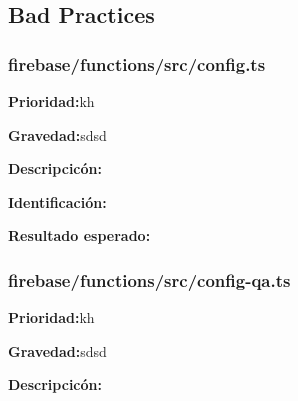 \documentclass{article}
\begin{document}
    \subsection{Bad Practices}
        \subsubsection{firebase/functions/src/config.ts}
        \begingroup
        \noindent
        \leftskip 35pt 
        \rightskip 0pt 
        \vspace{10pt}
        \textbf{Prioridad:}kh

        \endgroup

        \begingroup
        \noindent
        \leftskip 35pt 
        \rightskip 0pt 
        \vspace{10pt}
        \textbf{Gravedad:}sdsd

        \endgroup
            
        \begingroup
        \noindent
        \leftskip 35pt 
        \rightskip 0pt 
        \vspace{10pt}
        \textbf{Descripcicón:}
    
        \endgroup

        \begingroup
        \noindent
        \leftskip 35pt 
        \rightskip 0pt 
        \vspace{10pt}
        \textbf{Identificación:}
        
        \endgroup

        \begingroup
        \noindent
        \leftskip 35pt 
        \rightskip 0pt 
        \vspace{10pt}
        \textbf{Resultado esperado:}
    
        \endgroup
        \subsubsection{firebase/functions/src/config-qa.ts}
        \begingroup
        \noindent
        \leftskip 35pt 
        \rightskip 0pt 
        \vspace{10pt}
        \textbf{Prioridad:}kh

        \endgroup

        \begingroup
        \noindent
        \leftskip 35pt 
        \rightskip 0pt 
        \vspace{10pt}
        \textbf{Gravedad:}sdsd

        \endgroup
            
        \begingroup
        \noindent
        \leftskip 35pt 
        \rightskip 0pt 
        \vspace{10pt}
        \textbf{Descripcicón:}
    
\end{document}
